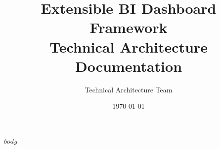 \documentclass[11pt,a4paper]{report}
\title{\textbf{Extensible BI Dashboard Framework}\\[0.5cm]
\Large Technical Architecture Documentation}
\author{Technical Architecture Team}
\date{\today}
\begin{document}
\maketitle
\tableofcontents
\newpage

$body$
\end{document}
